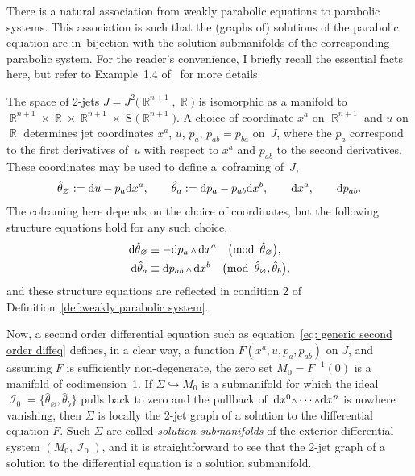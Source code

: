 \documentclass[10pt,a4paper]{amsart}
\DeclareMathOperator{\R}{\mathbb{R}}
\DeclareMathOperator{\Sym}{S}
\DeclareMathOperator{\I}{\mathcal{I}}
\renewcommand{\d}{{\rm d}}
\renewcommand{\mod}[1]{\quad\big(\mathrm{mod\enspace} #1\big)}
\newcommand{\w}{{\mathchoice{\,{\scriptstyle\wedge}\,}{{\scriptstyle\wedge}}
 {{\scriptscriptstyle\wedge}}{{\scriptscriptstyle\wedge}}}}
\numberwithin{equation}{section}
\begin{document}
\begin{Remark}
 There is a natural association from weakly parabolic equations to parabolic systems.
 This association is such that
 the (graphs of) solutions of the parabolic equation are in~bijection with the solution submanifolds of the corresponding parabolic system.
 For the reader's convenience, I briefly recall the essential facts here, but refer to
 Example~1.4 of~\cite{McMillan:ParabolicsI} for more details.

 The space of 2-jets $J = J^2\big(\!\R^{n+1},\R\!\big)$ is isomorphic as a manifold to $ \R^{n+1} \!\times\! \R \!\times\! \R^{n+1} \!\times\! \Sym\big(\!\R^{n+1}\!\big) $.
 A choice of coordinate $ x^a $ on $ \R^{n+1} $ and $ u $ on $ \R $ determines jet coordinates $ x^a$, $u$, $p_a$, $p_{ab}=p_{ba} $ on~$ J $, where the $p_a$ correspond to the first derivatives of~$u$ with respect to $x^a$ and $p_{ab}$ to the second derivatives.
 These coordinates may be used to define a~coframing of~$ J $,
 \begin{gather}\label{eq: generic second order coframing}
 \hat\theta_\varnothing := \d u - p_a\d x^a, \qquad
 \hat\theta_a := \d p_a - p_{ab}\d x^b, \qquad \d x^a, \qquad\d p_{ab} .
 \end{gather}
 The coframing here depends on the choice of coordinates, but the following structure equations hold for any such choice,
 \begin{align*}
 \d\hat\theta_\varnothing & \equiv - \d p_a \w \d x^a \mod{\hat\theta_{\varnothing}},
 \\
 \d\hat\theta_a & \equiv \d p_{ab} \w \d x^b \mod{\hat\theta_{\varnothing}, \hat\theta_{b}} ,
 \end{align*}
 and these structure equations are reflected in condition 2 of Definition~\ref{def:weakly parabolic system}.

 Now, a second order differential equation such as equation~\eqref{eq: generic second order diffeq} defines, in a clear way, a function $ F(x^a,u,p_a,p_{ab}) $ on $ J $, and assuming $ F $ is sufficiently non-degenerate, the zero set $ M_0 = F^{-1}(0) $ is a manifold of codimension~1.
 If $ \Sigma \hookrightarrow M_0 $ is a submanifold for which the ideal $ \I_0 = \big\{ \hat\theta_{\varnothing}, \hat\theta_{b} \big\} $ pulls back to zero and the pullback of~$ \d x^0 \w\cdots\w \d x^n $ is nowhere vanishing,
 then $ \Sigma $ is locally the 2-jet graph of a solution to the differential equation $F$.
 Such $ \Sigma $ are called \emph{solution submanifolds} of the exterior differential system $ (M_0, \I_0) $, and it is straightforward to see that the 2-jet graph of a solution to the differential equation is a solution submanifold.


\end{Remark}
\end{document}
